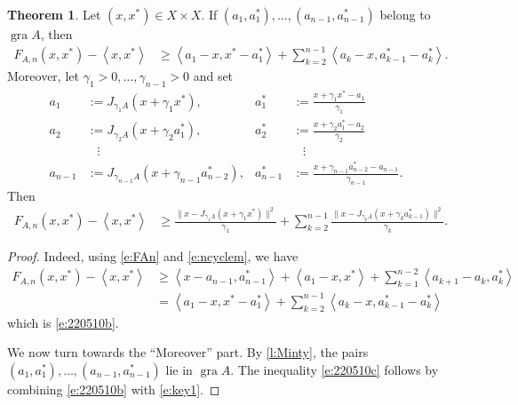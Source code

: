 \documentclass[12pt]{article}
\newcommand{\scal}[2]{\left\langle{#1},{#2}  \right\rangle}
\theoremstyle{definition}
\newtheorem{theorem}{Theorem}[section]
\providecommand{\gr}{\operatorname{gra}}
\providecommand{\gr}{\operatorname{gra}}
\begin{document}
{\begin{theorem}
Let $(x,x^*)\in X\times X$. If 
$(a_1,a_1^*),\ldots,(a_{n-1},a_{n-1}^*)$ belong to $\gr A$, then 
\begin{align}
\label{e:220510b}
F_{A,n}(x,x^*)-\scal{x}{x^*}
&\geq 
\scal{a_1-x}{x^*-a_1^*} + \sum_{k=2}^{n-1}\scal{a_k-x}{a_{k-1}^*-a_k^*}.
\end{align}
Moreover, let $\gamma_1>0,\ldots,\gamma_{n-1}>0$
and set 
\begin{subequations}
\begin{align}
a_1 &:= J_{\gamma_1A}(x+\gamma_1x^*), 
&a_1^* &:= \frac{x+\gamma_1x^*-a_1}{\gamma_1}\\
a_2 &:= J_{\gamma_2A}(x+\gamma_2a_1^*),
&a_2^* &:= \frac{x+\gamma_2a_1^*-a_2}{\gamma_2}\\
&\;\;\;\vdots & &\;\;\;\vdots&\\
a_{n-1} &:= J_{\gamma_{n-1}A}(x+\gamma_{n-1}a_{n-2}^*),
&a_{n-1}^* &:= \frac{x+\gamma_{n-1}a_{n-2}^*-a_{n-1}}{\gamma_{n-1}}.
\end{align}
\end{subequations}
Then 
\begin{align}
\label{e:220510c}
F_{A,n}(x,x^*)-\scal{x}{x^*}
&\geq 
\frac{\|x-J_{\gamma_1A}(x+\gamma_1x^*)\|^2}{\gamma_1}+ \sum_{k=2}^{n-1}
\frac{\|x-J_{\gamma_kA}(x+\gamma_ka_{k-1}^*)\|^2}{\gamma_k}.
\end{align}
\end{theorem}
\begin{proof}
Indeed, using \cref{e:FAn} and \cref{e:ncyclem}, we have 
\begin{subequations}
\begin{align}
F_{A,n}(x,x^*)-\scal{x}{x^*}
&\geq 
 \scal{x-a_{n-1}}{a_{n-1}^*} + \scal{a_1-x}{x^*} + 
\sum_{k=1}^{n-2}\scal{a_{k+1}-a_k}{a_k^*}\\
&=\scal{a_1-x}{x^*-a_1^*} + \sum_{k=2}^{n-1}\scal{a_k-x}{a_{k-1}^*-a_k^*}
\end{align}
\end{subequations}
which is \cref{e:220510b}.

We now turn towards the ``Moreover'' part.
By \cref{l:Minty}, 
the pairs $(a_1,a_1^*),\ldots,(a_{n-1},a_{n-1}^*)$ lie in $\gr A$. 
The inequality \cref{e:220510c} follows by combining 
\cref{e:220510b} with \cref{e:key1}.
\end{proof}

}
\end{document}
